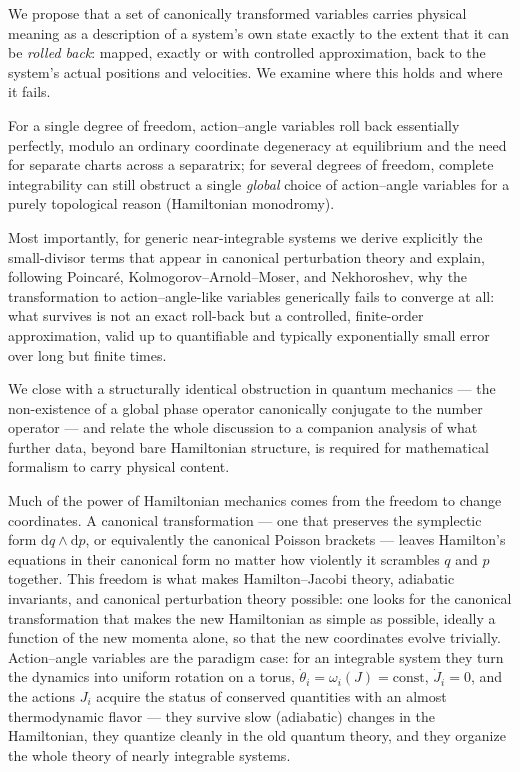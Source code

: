 We propose that a set of canonically transformed variables
carries physical meaning as a description of a system's own state exactly to
the extent that it can be \emph{rolled back}: mapped, exactly or with
controlled approximation, back to the system's actual positions and velocities.
We examine where this holds and where it fails. 

For a single degree of freedom,
action--angle variables roll back essentially perfectly, modulo an ordinary
coordinate degeneracy at equilibrium and the need for separate charts across a
separatrix; for several degrees of freedom, complete integrability can still
obstruct a single \emph{global} choice of action--angle variables for a purely
topological reason (Hamiltonian monodromy). 

Most importantly, for generic
near-integrable systems we derive explicitly the small-divisor terms that
appear in canonical perturbation theory and explain, following Poincar\'e,
Kolmogorov--Arnold--Moser, and Nekhoroshev, why the transformation to
action--angle-like variables generically fails to converge at all: what
survives is not an exact roll-back but a controlled, finite-order
approximation, valid up to quantifiable and typically exponentially small error
over long but finite times.

We close with a structurally identical obstruction
in quantum mechanics --- the non-existence of a global phase operator
canonically conjugate to the number operator --- and relate the whole
discussion to a companion analysis of what further data, beyond bare
Hamiltonian structure, is required for mathematical formalism to carry physical
content.

Much of the power of Hamiltonian mechanics comes from the freedom to change
coordinates. A canonical transformation --- one that preserves the symplectic
form $\mathrm{d} q\wedge \mathrm{d} p$, or equivalently the canonical Poisson
brackets --- leaves Hamilton's equations in their canonical form no matter how
violently it scrambles $q$ and $p$ together. This freedom is what makes
Hamilton--Jacobi theory, adiabatic invariants, and canonical perturbation
theory possible: one looks for the canonical transformation that makes the new
Hamiltonian as simple as possible, ideally a function of the new momenta alone,
so that the new coordinates evolve trivially. Action--angle variables are the
paradigm case: for an integrable system they turn the dynamics into uniform
rotation on a torus, $\dot\theta_i=\omega_i(J)=\text{const}$, $\dot J_i=0$, and
the actions $J_i$ acquire the status of conserved quantities with an almost
thermodynamic flavor --- they survive slow (adiabatic) changes in the
Hamiltonian, they quantize cleanly in the old quantum theory, and they organize
the whole theory of nearly integrable systems.

